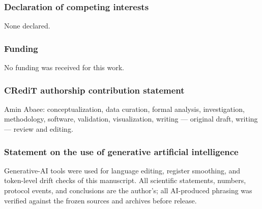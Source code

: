 \documentclass[11pt]{article}
\begin{document}
\subsubsection{Declaration of competing
interests}\label{declaration-of-competing-interests}

None declared.

\subsubsection{Funding}\label{funding}

No funding was received for this work.

\subsubsection{CRediT authorship contribution
statement}\label{credit-authorship-contribution-statement}

Amin Abaee: conceptualization, data curation, formal analysis,
investigation, methodology, software, validation, visualization, writing
--- original draft, writing --- review and editing.

\subsubsection{Statement on the use of generative artificial
intelligence}\label{statement-on-the-use-of-generative-artificial-intelligence}

Generative-AI tools were used for language editing, register smoothing,
and token-level drift checks of this manuscript. All scientific
statements, numbers, protocol events, and conclusions are the author's;
all AI-produced phrasing was verified against the frozen sources and
archives before release.
\end{document}
